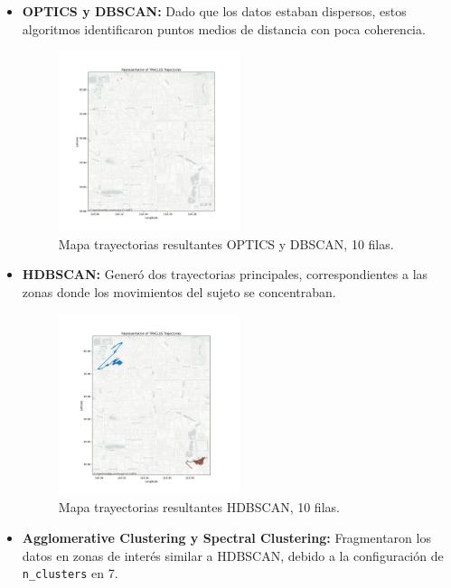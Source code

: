 \begin{itemize}
    \item \textbf{OPTICS y DBSCAN:} Dado que los datos estaban dispersos, estos algoritmos identificaron puntos medios de distancia con poca coherencia.
    
	\begin{figure}[h!]
   		\centering
    		\includegraphics[width=0.5\textwidth]{img/Geolife/map_optics_10datos.png}
    		\caption{Mapa trayectorias resultantes OPTICS y DBSCAN, 10 filas.}
    		\label{fig:geolife_10}
	\end{figure}
    
    \item \textbf{HDBSCAN:} Generó dos trayectorias principales, correspondientes a las zonas donde los movimientos del sujeto se concentraban.

	\begin{figure}[h!]
   		\centering
    		\includegraphics[width=0.5\textwidth]{img/Geolife/map_hdbscan_10datos.png}
    		\caption{Mapa trayectorias resultantes HDBSCAN, 10 filas.}
    		\label{fig:geolife_10}
	\end{figure}    
    
    \item \textbf{Agglomerative Clustering y Spectral Clustering:} Fragmentaron los datos en zonas de interés similar a HDBSCAN, debido a la configuración de \texttt{n\_clusters} en 7.


\end{itemize}
